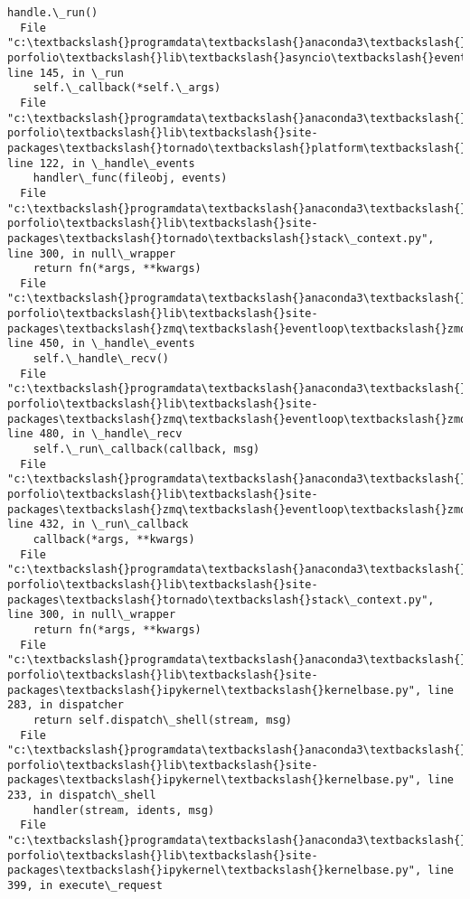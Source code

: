 \documentclass[11pt]{article}
\begin{document}
\begin{Verbatim}[commandchars=\\\{\}]
    handle.\_run()
  File "c:\textbackslash{}programdata\textbackslash{}anaconda3\textbackslash{}envs\textbackslash{}ml-porfolio\textbackslash{}lib\textbackslash{}asyncio\textbackslash{}events.py", line 145, in \_run
    self.\_callback(*self.\_args)
  File "c:\textbackslash{}programdata\textbackslash{}anaconda3\textbackslash{}envs\textbackslash{}ml-porfolio\textbackslash{}lib\textbackslash{}site-packages\textbackslash{}tornado\textbackslash{}platform\textbackslash{}asyncio.py", line 122, in \_handle\_events
    handler\_func(fileobj, events)
  File "c:\textbackslash{}programdata\textbackslash{}anaconda3\textbackslash{}envs\textbackslash{}ml-porfolio\textbackslash{}lib\textbackslash{}site-packages\textbackslash{}tornado\textbackslash{}stack\_context.py", line 300, in null\_wrapper
    return fn(*args, **kwargs)
  File "c:\textbackslash{}programdata\textbackslash{}anaconda3\textbackslash{}envs\textbackslash{}ml-porfolio\textbackslash{}lib\textbackslash{}site-packages\textbackslash{}zmq\textbackslash{}eventloop\textbackslash{}zmqstream.py", line 450, in \_handle\_events
    self.\_handle\_recv()
  File "c:\textbackslash{}programdata\textbackslash{}anaconda3\textbackslash{}envs\textbackslash{}ml-porfolio\textbackslash{}lib\textbackslash{}site-packages\textbackslash{}zmq\textbackslash{}eventloop\textbackslash{}zmqstream.py", line 480, in \_handle\_recv
    self.\_run\_callback(callback, msg)
  File "c:\textbackslash{}programdata\textbackslash{}anaconda3\textbackslash{}envs\textbackslash{}ml-porfolio\textbackslash{}lib\textbackslash{}site-packages\textbackslash{}zmq\textbackslash{}eventloop\textbackslash{}zmqstream.py", line 432, in \_run\_callback
    callback(*args, **kwargs)
  File "c:\textbackslash{}programdata\textbackslash{}anaconda3\textbackslash{}envs\textbackslash{}ml-porfolio\textbackslash{}lib\textbackslash{}site-packages\textbackslash{}tornado\textbackslash{}stack\_context.py", line 300, in null\_wrapper
    return fn(*args, **kwargs)
  File "c:\textbackslash{}programdata\textbackslash{}anaconda3\textbackslash{}envs\textbackslash{}ml-porfolio\textbackslash{}lib\textbackslash{}site-packages\textbackslash{}ipykernel\textbackslash{}kernelbase.py", line 283, in dispatcher
    return self.dispatch\_shell(stream, msg)
  File "c:\textbackslash{}programdata\textbackslash{}anaconda3\textbackslash{}envs\textbackslash{}ml-porfolio\textbackslash{}lib\textbackslash{}site-packages\textbackslash{}ipykernel\textbackslash{}kernelbase.py", line 233, in dispatch\_shell
    handler(stream, idents, msg)
  File "c:\textbackslash{}programdata\textbackslash{}anaconda3\textbackslash{}envs\textbackslash{}ml-porfolio\textbackslash{}lib\textbackslash{}site-packages\textbackslash{}ipykernel\textbackslash{}kernelbase.py", line 399, in execute\_request

\end{Verbatim}
\end{document}
